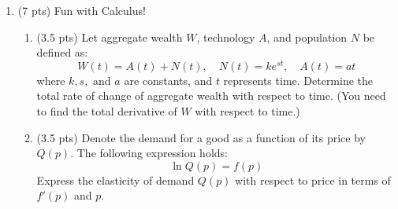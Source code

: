 \documentclass{./../../Latex/tests}
\begin{document}
\begin{enumerate}
\newpage
\item (7 pts) Fun with Calculus!
\begin{enumerate}
\item (3.5 pts) Let aggregate wealth \( W \), technology $A$, and population \( N \) be defined as:
\[
W(t) = A(t) + N(t), \quad N(t) = k e^{st}, \quad A(t) = at
\]
where \(k, s,\) and \( a \) are constants, and \( t \) represents time. Determine the total rate of change of aggregate wealth with respect to time. (You need to find the total derivative of $W$ with respect to time.)
\vspace{6cm}
\item (3.5 pts) Denote the demand for a good as a function of its price by $Q(p)$. The following expression holds:
$$ \ln Q(p) =  f(p)  $$
Express the elasticity of demand $Q(p)$ with respect to price in terms of $f'(p)$ and $p$. 
\end{enumerate}
\end{enumerate}
\end{document}
